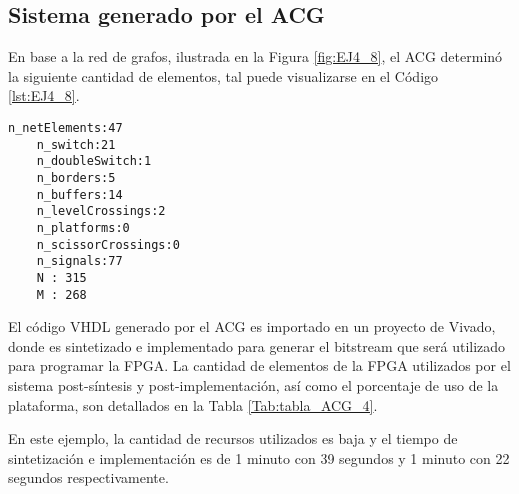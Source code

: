 \subsection{Sistema generado por el ACG}
	
	En base a la red de grafos, ilustrada en la Figura \ref{fig:EJ4_8}, el ACG determinó la siguiente cantidad de elementos, tal puede visualizarse en el Código \ref{lst:EJ4_8}.

	\begin{lstlisting}[language = {}, caption = Cantidad de elementos a implementar por el ACG, label = {lst:EJ4_8}]
	n_netElements:47
	n_switch:21
	n_doubleSwitch:1
	n_borders:5
	n_buffers:14
	n_levelCrossings:2
	n_platforms:0
	n_scissorCrossings:0
	n_signals:77
	N : 315
	M : 268
	\end{lstlisting}

	El código VHDL generado por el ACG es importado en un proyecto de Vivado, donde es sintetizado e implementado para generar el bitstream que será utilizado para programar la FPGA. La cantidad de elementos de la FPGA utilizados por el sistema post-síntesis y post-implementación, así como el porcentaje de uso de la plataforma, son detallados en la Tabla \ref{Tab:tabla_ACG_4}.
	
	\begin{table}[H]
		{
			\caption{Síntesis e implementación del ejemplo 4 generado por el ACG.}
			\label{Tab:tabla_ACG_4}
			\centering
			\begin{center}
			\end{center}
		}    
	\end{table}
	
	En este ejemplo, la cantidad de recursos utilizados es baja y el tiempo de sintetización e implementación es de 1 minuto con 39 segundos y 1 minuto con 22 segundos respectivamente.